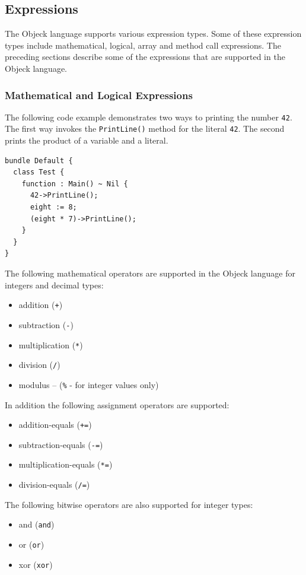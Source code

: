 \documentclass[12pt]{article}
\begin{document}
\subsection{Expressions}
The Objeck language supports various expression types.  Some of these expression types include mathematical, logical, array and method call expressions.  The preceding sections describe some of the expressions that are supported in the Objeck language.

\subsubsection{Mathematical and Logical Expressions}
The following code example demonstrates two ways to printing the number \texttt{42}.  The first way invokes the \texttt{PrintLine()} method for the literal \texttt{42}.  The second prints the product of a variable and a literal.

\begin{verbatim}
bundle Default {
  class Test {
    function : Main() ~ Nil {
      42->PrintLine();
      eight := 8;
      (eight * 7)->PrintLine();
    }
  }
}
\end{verbatim}

The following mathematical operators are supported in the Objeck language for integers and decimal types:
\begin{itemize}
    \item addition (\texttt{+})
    \item subtraction (\texttt{-})
    \item multiplication (\texttt{*})
    \item division (\texttt{/})
    \item modulus -- (\texttt{\%} - for integer values only)
\end{itemize}

In addition the following assignment operators are supported:
\begin{itemize}
    \item addition-equals (\texttt{+=})
    \item subtraction-equals (\texttt{-=})
    \item multiplication-equals (\texttt{*=})
    \item division-equals (\texttt{/=})
\end{itemize}

The following bitwise operators are also supported for integer types:
\begin{itemize}
    \item and (\texttt{and})
    \item or (\texttt{or})
    \item xor (\texttt{xor})
\end{itemize}
\end{document}
